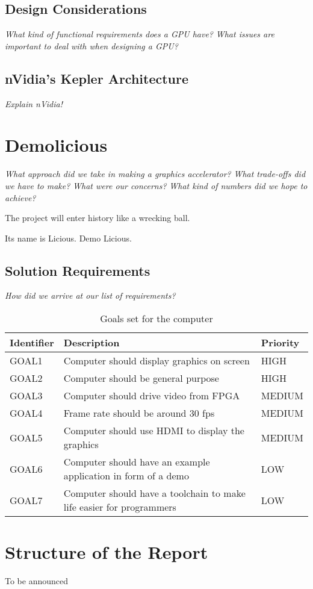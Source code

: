 \documentclass[../main/report.tex]{subfiles}
\begin{document}
\subsection{Design Considerations}

\textit{What kind of functional requirements does a GPU have?}
\textit{What issues are important to deal with when designing a GPU?}

\subsection{nVidia's Kepler Architecture} %

\textit{Explain nVidia!}

\section{Demolicious}

\textit{What approach did we take in making a graphics accelerator?}
\textit{What trade-offs did we have to make?}
\textit{What were our concerns?}
\textit{What kind of numbers did we hope to achieve?}

The project will enter history like a wrecking ball.

Its name is Licious. Demo Licious.

\subsection{Solution Requirements}

\textit{How did we arrive at our list of requirements?}

\begin{table}[htp]
    \centering
    \begin{tabular}{|l|p{8cm}|l|}
        \hline
        \textbf{Identifier}           & \textbf{Description}                & \textbf{Priority} \\ \hline
        GOAL1  & Computer should display graphics on screen                           & HIGH    \\ \hline
        GOAL2  & Computer should be general purpose                                   & HIGH    \\ \hline
        GOAL3  & Computer should drive video from FPGA                                & MEDIUM  \\ \hline
        GOAL4  & Frame rate should be around 30 fps                                   & MEDIUM  \\ \hline
        GOAL5  & Computer should use HDMI to display the graphics                     & MEDIUM  \\ \hline
        GOAL6  & Computer should have an example application in form of a demo        & LOW     \\ \hline
        GOAL7  & Computer should have a toolchain to make life easier for programmers & LOW     \\ \hline
    \end{tabular}
    \caption{Goals set for the computer}
    \label{tab:goals}
\end{table}

\newpage
\section{Structure of the Report}

To be announced
\end{document}

